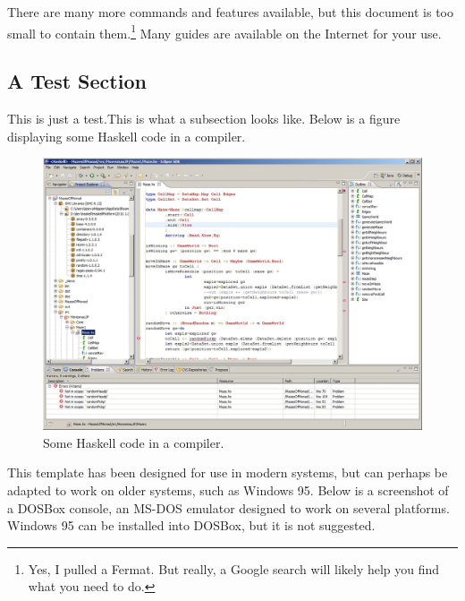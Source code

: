 There are many more commands and features available, but this document is too small to contain them.\footnote{Yes, I pulled a Fermat. But really, a Google search will likely help you find what you need to do.} Many guides are available on the Internet for your use.


\subsection{A Test Section}

This is just a test.This is what a subsection looks like. Below is a figure displaying some Haskell code in a compiler.

\begin{figure}[!ht]
	\centering
	\includegraphics[scale=0.26]{images/Haskell1.jpg}
	\caption{Some Haskell code in a compiler.}
\end{figure}

This template has been designed for use in modern systems, but can perhaps be adapted to work on older systems, such as Windows 95. Below is a screenshot of a DOSBox console, an MS-DOS emulator designed to work on several platforms. Windows 95 can be installed into DOSBox, but it is not suggested.

